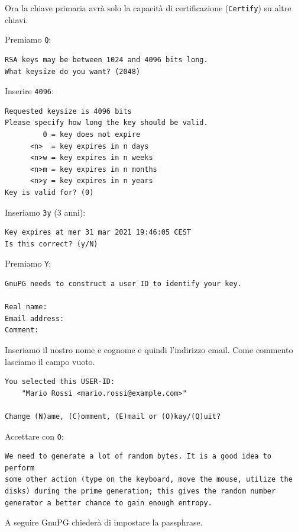 \documentclass[a4paper,10pt]{article}
\begin{document}
Ora la chiave primaria avrà solo la capacità di certificazione (\texttt{Certify}) su altre chiavi.

Premiamo \texttt{Q}:

\begin{lstlisting}
RSA keys may be between 1024 and 4096 bits long.
What keysize do you want? (2048)
\end{lstlisting}


Inserire \texttt{4096}:

\begin{lstlisting}
Requested keysize is 4096 bits
Please specify how long the key should be valid.
         0 = key does not expire
      <n>  = key expires in n days
      <n>w = key expires in n weeks
      <n>m = key expires in n months
      <n>y = key expires in n years
Key is valid for? (0)
\end{lstlisting}


Inseriamo \texttt{3y} (3 anni):

\begin{lstlisting}
Key expires at mer 31 mar 2021 19:46:05 CEST
Is this correct? (y/N)
\end{lstlisting}

Premiamo \texttt{Y}:

\begin{lstlisting}
GnuPG needs to construct a user ID to identify your key.

Real name:
Email address:
Comment:
\end{lstlisting}


Inseriamo il nostro nome e cognome e quindi l'indirizzo email.
Come commento lasciamo il campo vuoto.

\begin{lstlisting}
You selected this USER-ID:
    "Mario Rossi <mario.rossi@example.com>"

Change (N)ame, (C)omment, (E)mail or (O)kay/(Q)uit?
\end{lstlisting}

Accettare con \texttt{O}:

\begin{lstlisting}
We need to generate a lot of random bytes. It is a good idea to perform
some other action (type on the keyboard, move the mouse, utilize the
disks) during the prime generation; this gives the random number
generator a better chance to gain enough entropy.
\end{lstlisting}

A seguire GnuPG chiederà di impostare la passphrase.
\end{document}
